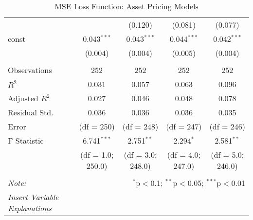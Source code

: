 \begin{table}[H]
\begin{tabular}{@{\extracolsep{5pt}}lcccc}
                        &                                                                                  & (0.120)           & (0.081)           & (0.077)       \\
    const               & 0.043$^{***}$                                                                    & 0.043$^{***}$     & 0.044$^{***}$     & 0.042$^{***}$ \\
                        & (0.004)                                                                          & (0.004)           & (0.005)           & (0.004)       \\
    \hline                                                                                                                                                         \\[-1.8ex]
    Observations        & 252                                                                              & 252               & 252               & 252           \\
    $R^2$               & 0.031                                                                            & 0.057             & 0.063             & 0.096         \\
    Adjusted $R^2$      & 0.027                                                                            & 0.046             & 0.048             & 0.078         \\
    Residual Std.       & 0.036                                                                            & 0.036             & 0.036             & 0.035         \\
    Error               & (df = 250)                                                                       & (df = 248)        & (df = 247)        & (df = 246)    \\
    F Statistic         & 6.741$^{***}$                                                                    & 2.751$^{**}$      & 2.294$^{*}$       & 2.581$^{**}$  \\
    &  (df = 1.0; 250.0) & (df = 3.0; 248.0)                                                                & (df = 4.0; 247.0) & (df = 5.0; 246.0)                 \\
    \hline
    \hline                                                                                                                                                         \\[-1.8ex]
    \textit{Note:}      & \multicolumn{4}{r}{$^{*}$p$<$0.1; $^{**}$p$<$0.05; $^{***}$p$<$0.01}                                                                     \\
    \textit{Insert Variable Explanations}                                                                                                                          \\
  \end{tabular}
  \caption{MSE Loss Function: Asset Pricing Models}
  \label{mse-tf-apm}
\end{table}





